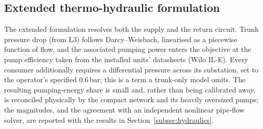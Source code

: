 \documentclass[a4paper,fleqn]{cas-sc}
\newcommand{\Lthree}{\ensuremath{\mathrm{L3}}}  %
\newcommand{\new}[1]{\textcolor[HTML]{1A5FB4}{#1}}   %
\newcommand{\new}[1]{#1}
\begin{document}
\new{}


\subsection{Extended thermo-hydraulic formulation}\label{sec:extended}
\new{}
The extended formulation resolves both the supply and the return circuit. Trunk pressure drop
(from $\Lthree$) follows Darcy--Weisbach, linearised as a piecewise function of flow, and the
associated pumping power enters the objective at the pump efficiency taken from the installed
units' datasheets (Wilo IL-E). Every consumer additionally requires a differential pressure
across its substation, set to the operator's specified $0.6$\,bar; this is a term a
trunk-only model omits. The resulting pumping-energy share is small and, rather than being
calibrated away, is reconciled physically by the compact network and its heavily oversized pumps;
the magnitudes, and the agreement with an independent nonlinear pipe-flow solver, are reported
with the results in Section~\ref{subsec:hydraulics}.
\end{document}
